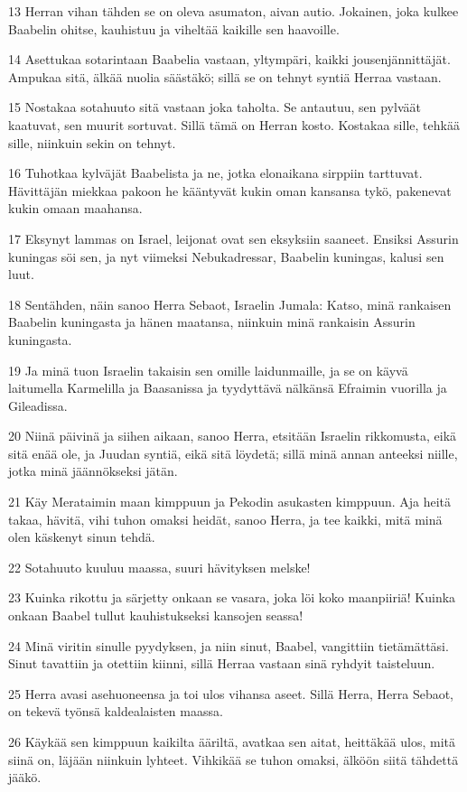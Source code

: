 \par 13 Herran vihan tähden se on oleva asumaton, aivan autio. Jokainen, joka kulkee Baabelin ohitse, kauhistuu ja viheltää kaikille sen haavoille.
\par 14 Asettukaa sotarintaan Baabelia vastaan, yltympäri, kaikki jousenjännittäjät. Ampukaa sitä, älkää nuolia säästäkö; sillä se on tehnyt syntiä Herraa vastaan.
\par 15 Nostakaa sotahuuto sitä vastaan joka taholta. Se antautuu, sen pylväät kaatuvat, sen muurit sortuvat. Sillä tämä on Herran kosto. Kostakaa sille, tehkää sille, niinkuin sekin on tehnyt.
\par 16 Tuhotkaa kylväjät Baabelista ja ne, jotka elonaikana sirppiin tarttuvat. Hävittäjän miekkaa pakoon he kääntyvät kukin oman kansansa tykö, pakenevat kukin omaan maahansa.
\par 17 Eksynyt lammas on Israel, leijonat ovat sen eksyksiin saaneet. Ensiksi Assurin kuningas söi sen, ja nyt viimeksi Nebukadressar, Baabelin kuningas, kalusi sen luut.
\par 18 Sentähden, näin sanoo Herra Sebaot, Israelin Jumala: Katso, minä rankaisen Baabelin kuningasta ja hänen maatansa, niinkuin minä rankaisin Assurin kuningasta.
\par 19 Ja minä tuon Israelin takaisin sen omille laidunmaille, ja se on käyvä laitumella Karmelilla ja Baasanissa ja tyydyttävä nälkänsä Efraimin vuorilla ja Gileadissa.
\par 20 Niinä päivinä ja siihen aikaan, sanoo Herra, etsitään Israelin rikkomusta, eikä sitä enää ole, ja Juudan syntiä, eikä sitä löydetä; sillä minä annan anteeksi niille, jotka minä jäännökseksi jätän.
\par 21 Käy Merataimin maan kimppuun ja Pekodin asukasten kimppuun. Aja heitä takaa, hävitä, vihi tuhon omaksi heidät, sanoo Herra, ja tee kaikki, mitä minä olen käskenyt sinun tehdä.
\par 22 Sotahuuto kuuluu maassa, suuri hävityksen melske!
\par 23 Kuinka rikottu ja särjetty onkaan se vasara, joka löi koko maanpiiriä! Kuinka onkaan Baabel tullut kauhistukseksi kansojen seassa!
\par 24 Minä viritin sinulle pyydyksen, ja niin sinut, Baabel, vangittiin tietämättäsi. Sinut tavattiin ja otettiin kiinni, sillä Herraa vastaan sinä ryhdyit taisteluun.
\par 25 Herra avasi asehuoneensa ja toi ulos vihansa aseet. Sillä Herra, Herra Sebaot, on tekevä työnsä kaldealaisten maassa.
\par 26 Käykää sen kimppuun kaikilta ääriltä, avatkaa sen aitat, heittäkää ulos, mitä siinä on, läjään niinkuin lyhteet. Vihkikää se tuhon omaksi, älköön siitä tähdettä jääkö.
